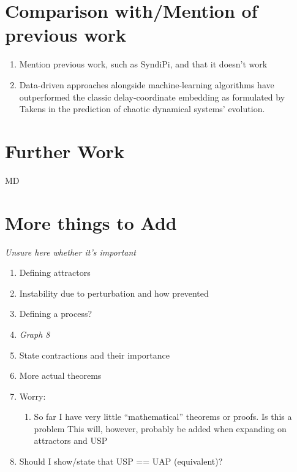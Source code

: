 \documentclass[12pt, oneside]{article}
\theoremstyle{definition}
\begin{document}
\section{Comparison with/Mention of previous work}

\begin{enumerate}
  \item Mention previous work, such as SyndiPi, and that it doesn’t work
  \item  Data-driven approaches alongside machine-learning algorithms have outperformed the classic delay-coordinate embedding as formulated by Takens in the prediction of chaotic dynamical systems’ evolution.
\end{enumerate}

\section{Further Work}

MD


\section{More things to Add}
\emph{Unsure here whether it's important}

\begin{enumerate}
  \item Defining attractors
  \item Instability due to perturbation and how prevented
  \item Defining a process?
  \item \emph{Graph 8}
  \item State contractions and their importance
  \item  More actual theorems
  \item Worry:
  \begin{enumerate}
    \item  So far I have very little “mathematical” theorems or proofs. Is this a problem
    \newline This will, however, probably be added when expanding on attractors and USP
  \end{enumerate}
  \item Should I show/state that USP == UAP (equivalent)?
  
\end{enumerate}
\end{document}
